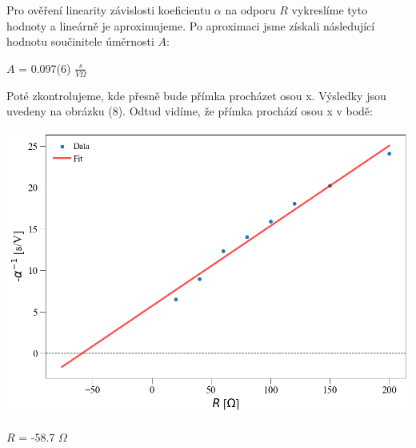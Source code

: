 \documentclass[a4paper,11pt]{article}
\begin{document}
\newpage
    \begin{minipage}[t]{0.5\textwidth} 
                Pro ověření linearity závislosti koeficientu $\alpha$ na odporu $R$ vykreslíme tyto hodnoty a lineárně je aproximujeme. Po aproximaci jsme získali následující hodnotu součinitele úměrnosti $A$:
                \begin{center}
                    $A$ = 0.097(6) $\frac{s}{V \Omega}$
                \end{center}
                Poté zkontrolujeme, kde přesně bude přímka procházet osou x. Výsledky jsou uvedeny na obrázku (8).
                Odtud vidíme, že přímka prochází osou x v bodě: 
                \vspace{10pt}   
                \par \centering
                \includegraphics[scale=0.35]{alpha_2}
                \captionsetup{justification=centering, font=footnotesize}
                \label{fig:alpha_2}
                \vspace{10pt}
                \raggedright
                \begin{center}
                    $R$ = -58.7 $\Omega$
                \end{center}
    \end{minipage}
    \hspace{10pt}
\end{document}
